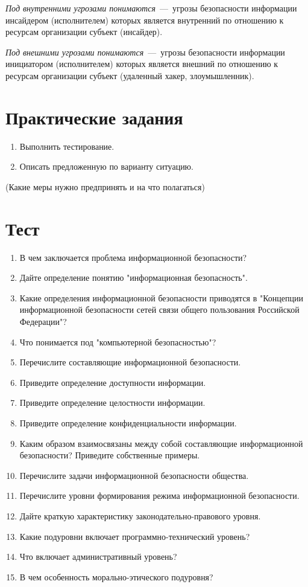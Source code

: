 \emph{Под внутренними угрозами понимаются}~---~угрозы безопасности информации
инсайдером (исполнителем) которых является внутренний по отношению к ресурсам
организации субъект (инсайдер).

\emph{Под внешними угрозами понимаются}~---~угрозы безопасности информации
инициатором (исполнителем) которых является внешний по отношению к ресурсам
организации субъект (удаленный хакер, злоумышленник).



\section{Практические задания}\label{sect1_b}
%
\begin{enumerate}
\item Выполнить тестирование. %
\item Описать предложенную по варианту ситуацию.
\end{enumerate}

 (Какие меры нужно предпринять и на что
полагаться)

\section{Тест}\label{sect1_с}
%
\begin{enumerate}
  \item В чем заключается проблема информационной безопасности?
  \item Дайте определение понятию "информационная безопасность".
  \item Какие определения информационной безопасности приводятся в
      "Концепции информационной безопасности сетей связи общего пользования
      Российской Федерации"?
  \item Что понимается под "компьютерной безопасностью"?
  \item Перечислите составляющие информационной безопасности.
  \item Приведите определение доступности информации.
  \item Приведите определение целостности информации.
  \item Приведите определение конфиденциальности информации.
  \item Каким образом взаимосвязаны между собой составляющие информационной
      безопасности? Приведите собственные примеры.
  \item Перечислите задачи информационной безопасности общества.
  \item Перечислите уровни формирования режима информационной безопасности.
  \item Дайте краткую характеристику законодательно-правового уровня.
  \item Какие подуровни включает программно-технический уровень?
  \item Что включает административный уровень?
  \item В чем особенность морально-этического подуровня?
\end{enumerate}
